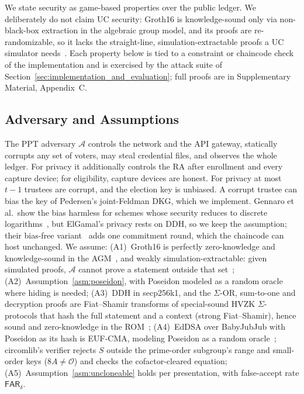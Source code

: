 \documentclass[10pt,letterpaper,journal]{IEEEtran}
\begin{document}
We state security as game-based properties over the public ledger. We deliberately do not claim UC security: Groth16 is knowledge-sound only via non-black-box extraction in the algebraic group model, and its proofs are re-randomizable, so it lacks the straight-line, simulation-extractable proofs a UC simulator needs~\cite{Baghery2021}. Each property below is tied to a constraint or chaincode check of the implementation and is exercised by the attack suite of Section~\ref{sec:implementation_and_evaluation}; full proofs are in Supplementary Material, Appendix~C.

\subsection{Adversary and Assumptions}
\label{sec:assumptions}
The PPT adversary $\mathcal{A}$ controls the network and the API gateway, statically corrupts any set of voters, may steal credential files, and observes the whole ledger. For privacy it additionally controls the RA after enrollment and every capture device; for eligibility, capture devices are honest. For privacy at most $t-1$ trustees are corrupt, and the election key is unbiased. A corrupt trustee can bias the key of Pedersen's joint-Feldman DKG, which we implement. Gennaro et al.\ show the bias harmless for schemes whose security reduces to discrete logarithms~\cite{Gennaro2003}, but ElGamal's privacy rests on DDH, so we keep the assumption; their bias-free variant~\cite{Gennaro2007} adds one commitment round, which the chaincode can host unchanged. We assume:
(A1)~Groth16 is perfectly zero-knowledge and knowledge-sound in the AGM~\cite{Groth2016,Fuchsbauer2018}, and weakly simulation-extractable: given simulated proofs, $\mathcal{A}$ cannot prove a statement outside that set~\cite{Baghery2021};
(A2)~Assumption~\ref{asm:poseidon}, with Poseidon modeled as a random oracle where hiding is needed;
(A3)~DDH in secp256k1, and the $\Sigma$-OR, sum-to-one and decryption proofs are Fiat--Shamir transforms of special-sound HVZK $\Sigma$-protocols that hash the full statement and a context (strong Fiat--Shamir), hence sound and zero-knowledge in the ROM~\cite{fiat1987how,Bernhard2012};
(A4)~EdDSA over BabyJubJub with Poseidon as its hash is EUF-CMA, modeling Poseidon as a random oracle~\cite{Bernstein2012}; circomlib's verifier rejects $S$ outside the prime-order subgroup's range and small-order keys ($8A \neq \mathcal{O}$) and checks the cofactor-cleared equation;
(A5)~Assumption~\ref{asm:uncloneable} holds per presentation, with false-accept rate $\mathsf{FAR}_\delta$.
\end{document}
